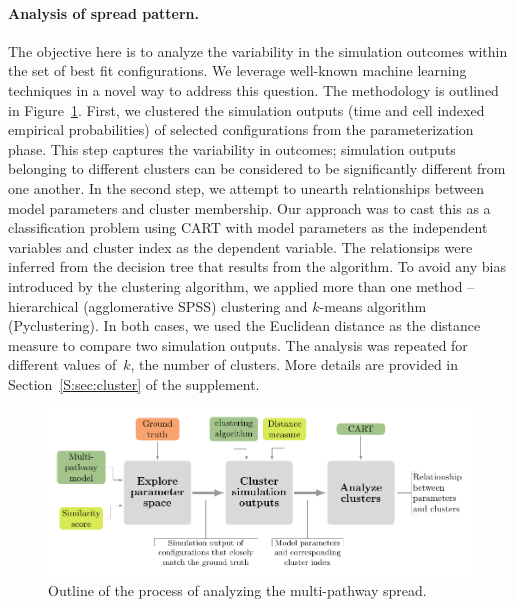 \documentclass[11pt]{article}
\theoremstyle{definition}
\begin{document}

\paragraph{Analysis of spread pattern.} The objective here is to analyze
the variability in the simulation outcomes within the set of best fit
configurations. We leverage well-known machine learning techniques in a
novel way to address this question. The methodology is 
outlined in Figure~\ref{fig:clusterOutline}. First, we clustered
the simulation outputs (time and cell indexed empirical probabilities) of
selected configurations from the parameterization phase. This step captures
the variability in outcomes; simulation outputs belonging to different
clusters can be considered to be significantly different from one another.
In the second step, we attempt to unearth relationships between model
parameters and cluster membership. Our approach was to cast this as a
classification problem using CART with model parameters as the independent
variables and cluster index as the dependent variable. The relationsips
were inferred from the decision tree that results from the algorithm.
To avoid any bias introduced by the clustering algorithm, we applied more
than one method -- hierarchical (agglomerative SPSS) clustering and $k$-means
algorithm (Pyclustering). In both cases, we used the Euclidean distance as the distance
measure to compare two simulation outputs. The analysis was repeated for
different values of~$k$, the number of clusters. More details are provided
in Section~\ref{S:sec:cluster} of the supplement.
\begin{figure}[htb]
    \centering
    \includegraphics[width=.8\textwidth]{figs/spread_analysis.pdf}
    \caption{Outline of the process of analyzing the multi-pathway spread. \label{fig:clusterOutline}}
\end{figure}
\end{document}

